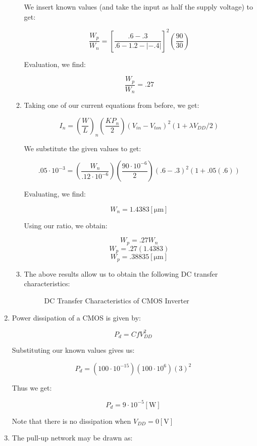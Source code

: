 \begin{enumerate}
\begin{enumerate}
        We insert known values (and take the input as half the supply voltage) to get:

        $$\frac{W_p}{W_n}=\left[ \frac{.6-.3}{.6-1.2-|-.4|} \right]^2\left( \frac{90}{30} \right)$$

        Evaluation, we find:

        $$\boxed{\frac{W_p}{W_n}=.27}$$

      \item Taking one of our current equations from before, we get:

        $$I_n=\left( \frac{W}{L} \right)_n\left(\frac{KP_n}{2}\right)(V_{in}-V_{ton})^2(1+\lambda V_{DD}/2)$$

        We substitute the given values to get:

        $$.05\cdot10^{-3}=\left( \frac{W_n}{.12\cdot10^{-6}} \right)\left(\frac{90\cdot10^{-6}}{2}\right)(.6-.3)^2(1+.05 (.6))$$
        
        Evaluating, we find:

        $$\boxed{W_n=1.4383[\si{\micro\meter}]}$$

        Using our ratio, we obtain:

        $$W_p=.27W_n$$
        $$W_p=.27(1.4383)$$
        $$\boxed{W_p=.38835[\si{\micro\meter}]}$$

      \item The above results allow us to obtain the following DC transfer characteristics:

        \begin{figure}[H]
          \centering
          
          \caption{DC Transfer Characteristics of CMOS Inverter}
          \label{fig:4}
        \end{figure}

    \end{enumerate}

  \item Power dissipation of a CMOS is given by:

    $$P_d=CfV_{DD}^2$$

    Substituting our known values gives us:

    $$P_d=(100\cdot10^{-15})(100\cdot10^6)(3)^2$$

    Thus we get:

    $$\boxed{P_d=9\cdot10^{-5}[\si{\watt}]}$$

    Note that there is no dissipation when $V_{DD}=0[\si{\volt}]$

  \item The pull-up network may be drawn as:


\end{enumerate}
